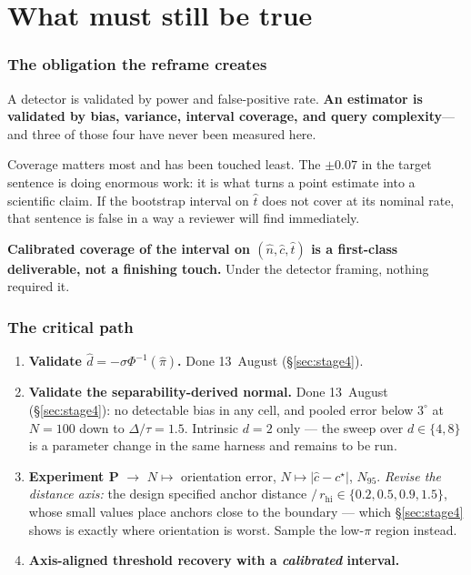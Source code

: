 \documentclass[11pt]{article}
\newcommand{\dhat}{\hat{d}}
\newcommand{\pihat}{\hat{\pi}}
\newcommand{\nhat}{\hat{n}}
\newcommand{\chat}{\hat{c}}
\newcommand{\that}{\hat{t}}
\begin{document}
\part{What must still be true}

\section{The obligation the reframe creates}
\label{sec:obligation}

A detector is validated by power and false-positive rate. \textbf{An estimator is validated by
bias, variance, interval coverage, and query complexity}---and three of those four have never been
measured here.

Coverage matters most and has been touched least. The $\pm 0.07$ in the target sentence is doing
enormous work: it is what turns a point estimate into a scientific claim. If the bootstrap
interval on $\that$ does not cover at its nominal rate, that sentence is false in a way a reviewer
will find immediately.

\begin{claimbox}
\noindent \textbf{Calibrated coverage of the interval on $(\nhat, \chat, \that)$ is a first-class
deliverable, not a finishing touch.} Under the detector framing, nothing required it.
\end{claimbox}

\section{The critical path}
\label{sec:path}

\begin{enumerate}
\item \textbf{Validate $\dhat = -\sigma\Phi^{-1}(\pihat)$.} \textcolor{okgreen}{Done 13~August}
(\S\ref{sec:stage4}).
\item \textbf{Validate the separability-derived normal.} \textcolor{okgreen}{Done 13~August}
(\S\ref{sec:stage4}): no detectable bias in any cell, and pooled error below $3^\circ$ at
$N = 100$ down to $\Delta/\tau = 1.5$. Intrinsic $d = 2$ only --- the sweep over
$d \in \{4, 8\}$ is a parameter change in the same harness and remains to be run.
\item \textbf{Experiment P} $\to$ $N \mapsto$ orientation error, $N \mapsto |\chat - c^\star|$,
$N_{95}$. \emph{Revise the distance axis:} the design specified anchor distance
$/\,r_{\text{hi}} \in \{0.2, 0.5, 0.9, 1.5\}$, whose small values place anchors close to the
boundary --- which \S\ref{sec:stage4} shows is exactly where orientation is worst. Sample
the low-$\pi$ region instead.
\item \textbf{Axis-aligned threshold recovery with a \emph{calibrated} interval.}
\end{enumerate}
\end{document}
